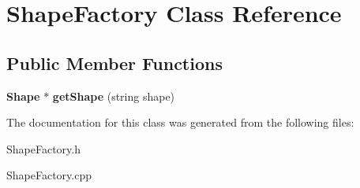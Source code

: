 \section{Shape\-Factory Class Reference}
\label{class_shape_factory}
\subsection*{Public Member Functions}
\begin{DoxyCompactItemize}
\item 
{\bf Shape} $\ast$ {\bfseries get\-Shape} (string shape)\label{class_shape_factory_a98dfc361e8d31bec579a009b2fbda196}

\end{DoxyCompactItemize}


The documentation for this class was generated from the following files\-:\begin{DoxyCompactItemize}
\item 
Shape\-Factory.\-h\item 
Shape\-Factory.\-cpp\end{DoxyCompactItemize}
